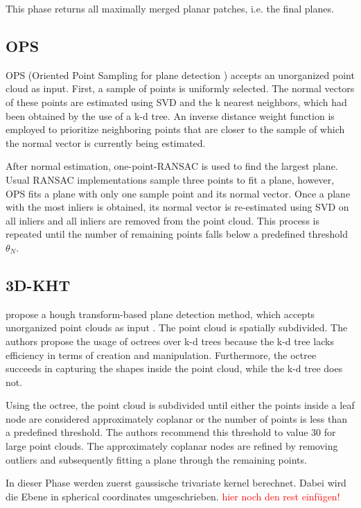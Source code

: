 \documentclass[main.tex]{subfiles}
\begin{document}
This phase returns all maximally merged planar patches, i.e. the final planes.

\subsection{OPS}
OPS (Oriented Point Sampling for plane detection \cite{Sun_Mordohai_2019}) accepts an unorganized point cloud as input.
First, a sample of points is uniformly selected. The normal vectors of these points are estimated using SVD and the k nearest neighbors, which had been obtained by the use of a k-d tree.
An inverse distance weight function is employed to prioritize neighboring points that are closer to the sample of which the normal vector is currently being estimated.


After normal estimation, one-point-RANSAC is used to find the largest plane. Usual RANSAC implementations sample three points to fit a plane, however, OPS fits a plane with only one sample point and its normal vector.
Once a plane with the most inliers is obtained, its normal vector is re-estimated using SVD on all inliers and all inliers are removed from the point cloud.
This process is repeated until the number of remaining points falls below a predefined threshold $\theta_N$.

\subsection{3D-KHT}\label{sub:3dkht}
\citeauthor{Limberger_Oliveira_2015} propose a hough transform-based plane detection method, which accepts unorganized point clouds as input \cite{Limberger_Oliveira_2015}.
The point cloud is spatially subdivided. The authors propose the usage of octrees over k-d trees because the k-d tree lacks efficiency in terms of 
creation and manipulation. Furthermore, the octree succeeds in capturing the shapes inside the point cloud, while the k-d tree does not.   

Using the octree, the point cloud is subdivided until either the points inside a leaf node are considered approximately coplanar or the number of points is less than 
a predefined threshold. The authors recommend this threshold to value 30 for large point clouds.
The approximately coplanar nodes are refined by removing outliers and subsequently fitting a plane through the remaining points.


In dieser Phase werden zuerst gaussische trivariate kernel berechnet. Dabei wird die Ebene in spherical coordinates umgeschrieben.
\textcolor{red}{hier noch den rest einfügen!}
\end{document}
